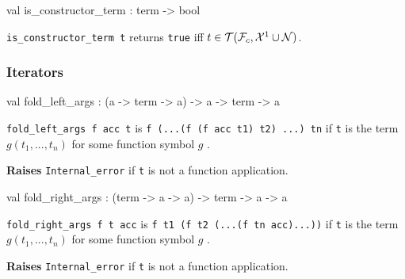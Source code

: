 \label{val:Term.is-underscoreconstructor-underscoreterm}\begin{ocamldoccode}
val is_constructor_term : term -> bool
\end{ocamldoccode}
\begin{ocamldocdescription}
{\tt{is\_constructor\_term t}} returns {\tt{true}} iff $t \in \mathcal{T}(\mathcal{F}_c, \mathcal{X}^1 \cup \mathcal{N})$. 


\end{ocamldocdescription}




\subsubsection{Iterators}




\label{val:Term.fold-underscoreleft-underscoreargs}\begin{ocamldoccode}
val fold_left_args : ({\textquotesingle}a -> term -> {\textquotesingle}a) -> {\textquotesingle}a -> term -> {\textquotesingle}a
\end{ocamldoccode}
\begin{ocamldocdescription}
{\tt{fold\_left\_args f acc t}} is {\tt{f (...(f (f acc t1) t2) ...) tn}} if {\tt{t}} is
    the term $g(t_1,...,t_n)$  for some function symbol $g$ .

{\bf Raises} {\tt{Internal\_error}} if {\tt{t}} is not a function application.


\end{ocamldocdescription}




\label{val:Term.fold-underscoreright-underscoreargs}\begin{ocamldoccode}
val fold_right_args : (term -> {\textquotesingle}a -> {\textquotesingle}a) -> term -> {\textquotesingle}a -> {\textquotesingle}a
\end{ocamldoccode}
\begin{ocamldocdescription}
{\tt{fold\_right\_args f t acc}} is {\tt{f t1 (f t2 (...(f tn acc)...))}} if {\tt{t}} is
    the term $g(t_1,...,t_n)$  for some function symbol $g$ .

{\bf Raises} {\tt{Internal\_error}} if {\tt{t}} is not a function application.


\end{ocamldocdescription}




